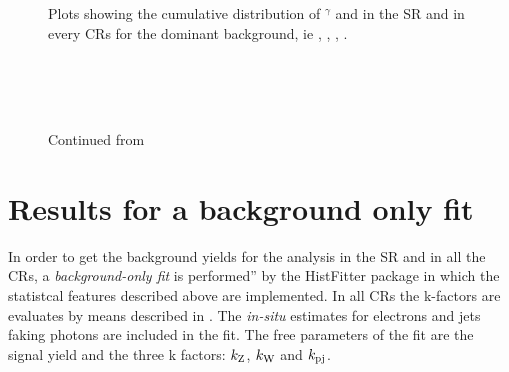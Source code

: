 \begin{figure}[pt]
\centering
{} \quad
{} \\

 \quad
{} \\

\caption{Plots showing the cumulative distribution of \pt$^{\gamma}$ and \met in the SR and in every CRs for the dominant background, ie \znng, \zg, \wg, \gj.}
\label{fig:prefit}
\end{figure}

\begin{figure}[pt]
\centering

 \quad
{} \\

 \quad
{} \\

 \quad
{} \\

\caption{Continued from \Fig{\ref{fig:prefit}}}
\label{fig:prefitcont}
\end{figure}

\section{Results for a background only fit}
In order to get the background yields for the analysis in the SR and in all the CRs, a \emph{background-only fit} is performed'' by the HistFitter package in which the statistcal features described above are implemented. In all CRs the k-factors are evaluates by means described in \Sect{\ref{sec:kfactor}}. The \emph{in-situ} estimates for electrons and jets faking photons are included in the fit. The free parameters of the fit are the signal yield and the three k factors: $k_{\textup{Z}}$, $k_{\textup{W}}$ and $k_{\textup{pj}}$.

